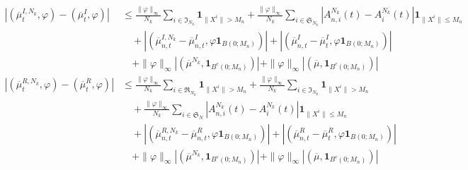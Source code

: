 \documentclass[notitlepage,reqno,11pt]{amsart}
\numberwithin{equation}{section}
\begin{document}
\begin{align*}
\left|( \overline{\mu}_{t}^{I,N_k},\varphi )-( \overline{\mu}_{t}^{I},\varphi )\right|&\leq \frac{\|\varphi\|_{\infty}}{N_k}\sum_{i\in \mathfrak{I}_{N_k}}\mathbf{1}_{\|X^i\|>M_n}+\frac{\|\varphi\|_{\infty}}{N_k}\sum_{i\in\mathfrak{S}_{N_k}}\left|A_{n,i}^{N_k}(t)-A_{i}^{N_k}(t)\right|\mathbf{1}_{\|X^i\|\leq M_n}\\
&\quad+\left|(  \overline{\mu}_{n,t}^{I,N_k}- \overline{\mu}_{n,t}^{I},\varphi \mathbf{1}_{B(0;M_n)})\right|
  +\left|(  \overline{\mu}_{n,t}^{I}- \overline{\mu}_{t}^{I},\varphi \mathbf{1}_{B(0;M_n)})\right|\\
  &\quad+\|\varphi\|_{\infty}\left|( \overline{\mu}^{N_k}, \mathbf{1}_{B^c(0;M_n) })\right|+\|\varphi\|_{\infty}\left|( \overline{\mu}, \mathbf{1}_{B^c(0;M_n) })\right|\\
  \left|( \overline{\mu}_{t}^{R,N_k},\varphi )-( \overline{\mu}_{t}^{R},\varphi )\right|&\leq \frac{\|\varphi\|_{\infty}}{N_k}\sum_{i\in \mathfrak{R}_{N_k}}\mathbf{1}_{\|X^i\|>M_n}+\frac{\|\varphi\|_{\infty}}{N_k}\sum_{i\in \mathfrak{I}_{N_k}}\mathbf{1}_{\|X^i\|>M_n}\\
  &\quad+\frac{\|\varphi\|_{\infty}}{N_k}\sum_{i\in\mathfrak{S}_N}\left|A_{n,i}^{N_k}(t)-A_{i}^{N_k}(t)\right|\mathbf{1}_{\|X^i\|\leq M_n}\nonumber\\
  &\quad+\left|(  \overline{\mu}_{n,t}^{R,N_k}- \overline{\mu}_{n,t}^{R},\varphi  \mathbf{1}_{B(0;M_n)})\right|
  +\left|(  \overline{\mu}_{n,t}^{R}- \overline{\mu}_{t}^{R},\varphi \mathbf{1}_{B(0;M_n)})\right|\\
  &\quad+\|\varphi\|_{\infty}\left|( \overline{\mu}^{N_k}, \mathbf{1}_{B^c(0;M_n)})\right|
  +\|\varphi\|_{\infty}\left|( \overline{\mu}, \mathbf{1}_{B^c(0;M_n) })\right|\\

\end{align*}
\end{document}
